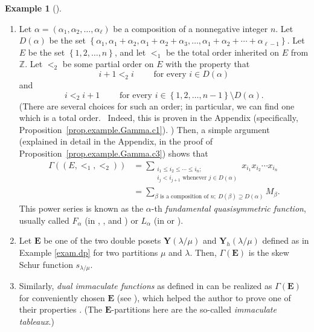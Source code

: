 \documentclass[numbers=enddot,12pt,final,onecolumn,notitlepage,abstracton]{scrartcl}
\theoremstyle{definition}
\newtheorem{exam}[theo]{Example}
\newenvironment{example}[1][]
{\begin{exam}[#1]\begin{leftbar}}
{\end{leftbar}\end{exam}}
\let\sumnonlimits\sum
\renewcommand{\sum}{\sumnonlimits\limits}
\newenvironment{verlong}{}{}
\newcommand{\EE}{{\mathbf{E}}}
\newcommand{\ZZ}{{\mathbb{Z}}}
\begin{document}
\begin{example}
\begin{enumerate}
\item[(c)] Let
$\alpha = \left(\alpha_1, \alpha_2, \ldots, \alpha_\ell\right)$
be a composition of a nonnegative integer $n$. Let
$D\left(\alpha\right)$ be the set
$\left\{\alpha_1, \alpha_1 + \alpha_2, \alpha_1 + \alpha_2
+ \alpha_3, \ldots, \alpha_1 + \alpha_2 + \cdots + \alpha_{\ell-1}
\right\}$.
Let $E$ be the set $\left\{1, 2, \ldots, n\right\}$, and let
$<_1$ be the total order inherited on $E$ from $\ZZ$. Let $<_2$ be some
partial order on $E$ with the property that
\[
i+1 <_2 i \qquad \text{ for every } i \in D\left(\alpha\right)
\]
and
\[
i <_2 i+1 \qquad \text{ for every }
i \in \left\{1, 2, \ldots, n-1\right\}
\setminus D\left(\alpha\right) .
\]
(There are several choices for such an order; in particular, we
can find one which is a total order.%
\begin{verlong}
\ Indeed, this is proven in the Appendix
(specifically, Proposition~\ref{prop.example.Gamma.c1}).%
\end{verlong}
) Then,
\begin{verlong}
a simple argument (explained in detail in the Appendix, in the
proof of Proposition~\ref{prop.example.Gamma.c3}) shows that
\end{verlong}
\begin{align*}
\Gamma\left(\left(E, <_1, <_2\right)\right)
&= \sum_{\substack{i_1 \leq i_2 \leq \cdots \leq i_n; \\
                  i_j < i_{j+1} \text{ whenever } j \in D\left(\alpha\right)}}
  x_{i_1} x_{i_2} \cdots x_{i_n} \\
&= \sum_{\beta\text{ is a composition of }n;
        \ D\left(\beta\right) \supseteq D\left(\alpha\right)}
  M_\beta .
\end{align*}
This power series is known as the $\alpha$-th
\textit{fundamental quasisymmetric function}, usually called
$F_\alpha$ (in \cite{Gessel}, \cite[\S 2]{Mal-Reu-dua},
\cite[\S 2.4]{BBSSZ} and \cite[\S 2]{Gri-dimm})
or $L_\alpha$ (in \cite[\S 7.19]{Stanley-EC2} or
\cite[Definition 5.2.4]{Reiner}).

\item[(d)] Let $\EE$ be one of the two double posets
$\mathbf{Y}\left(\lambda / \mu\right)$ and
$\mathbf{Y}_h\left(\lambda / \mu\right)$
defined as in Example \ref{exam.dp} for two partitions $\mu$
and $\lambda$. Then, $\Gamma\left(\EE\right)$ is the skew
Schur function $s_{\lambda / \mu}$.

\item[(e)] Similarly, \textit{dual immaculate functions} as defined in
\cite[\S 3.7]{BBSSZ} can be realized as $\Gamma\left(\EE\right)$
for conveniently chosen $\EE$ (see \cite[Proposition 4.4]{Gri-dimm}), which
helped the author to prove one of their properties \cite{Gri-dimm}.
(The $\EE$-partitions here are the so-called
\textit{immaculate tableaux}.)


\end{enumerate}
\end{example}
\end{document}

